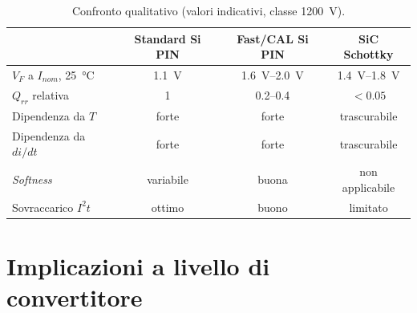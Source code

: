 \documentclass[11pt,a4paper]{article}
\begin{document}
\begin{table}[htbp]
\centering
\caption{Confronto qualitativo (valori indicativi, classe \SI{1200}{\volt}).}
\begin{tabular}{lccc}
\toprule
 & Standard Si PIN & Fast/CAL Si PIN & SiC Schottky \\
\midrule
$V_F$ a $I_{nom}$, \SI{25}{\celsius} & \SI{1.1}{\volt} & \SIrange{1.6}{2.0}{\volt} & \SIrange{1.4}{1.8}{\volt} \\
$Q_{rr}$ relativa & 1 & 0.2--0.4 & $<0.05$ \\
Dipendenza da $T$ & forte & forte & trascurabile \\
Dipendenza da $di/dt$ & forte & forte & trascurabile \\
\emph{Softness} & variabile & buona & non applicabile \\
Sovraccarico $I^{2}t$ & ottimo & buono & limitato \\
\bottomrule
\end{tabular}
\end{table}

\section{Implicazioni a livello di convertitore}
\end{document}
